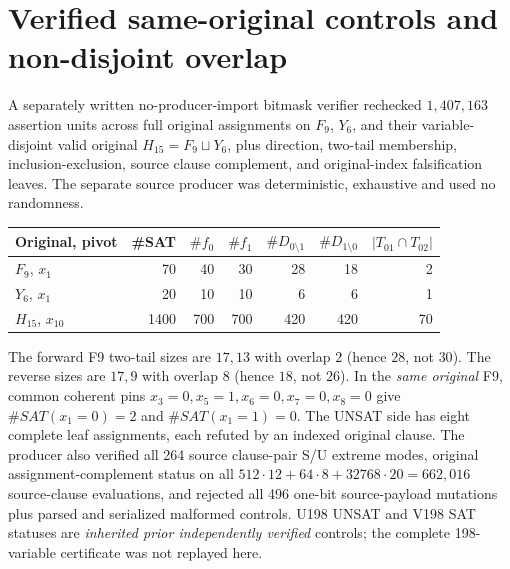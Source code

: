 \documentclass[11pt]{article}
\begin{document}
\section{Verified same-original controls and non-disjoint overlap}
A separately written no-producer-import bitmask verifier rechecked $1,407,163$ assertion units across full original assignments on $F_9$, $Y_6$, and their variable-disjoint valid original $H_{15}=F_9\sqcup Y_6$, plus direction, two-tail membership, inclusion-exclusion, source clause complement, and original-index falsification leaves. The separate source producer was deterministic, exhaustive and used no randomness.
\begin{center}\begin{tabular}{lrrrrrr}
\toprule
Original, pivot & \#SAT & $\#f_0$ & $\#f_1$ & $\#D_{0\setminus1}$ & $\#D_{1\setminus0}$ & $|T_{01}\cap T_{02}|$ \\
\midrule
$F_9$, $x_1$ &70&40&30&28&18&2\\
$Y_6$, $x_1$ &20&10&10&6&6&1\\
$H_{15}$, $x_{10}$ &1400&700&700&420&420&70\\
\bottomrule
\end{tabular}\end{center}
The forward F9 two-tail sizes are $17,13$ with overlap $2$ (hence $28$, not $30$). The reverse sizes are $17,9$ with overlap $8$ (hence $18$, not $26$). In the \emph{same original} F9, common coherent pins $x_3=0,x_5=1,x_6=0,x_7=0,x_8=0$ give $\#SAT(x_1=0)=2$ and $\#SAT(x_1=1)=0$. The UNSAT side has eight complete leaf assignments, each refuted by an indexed original clause. The producer also verified all 264 source clause-pair S/U extreme modes, original assignment-complement status on all $512\cdot12+64\cdot8+32768\cdot20=662,016$ source-clause evaluations, and rejected all 496 one-bit source-payload mutations plus parsed and serialized malformed controls. U198 UNSAT and V198 SAT statuses are \emph{inherited prior independently verified} controls; the complete 198-variable certificate was not replayed here.
\end{document}
